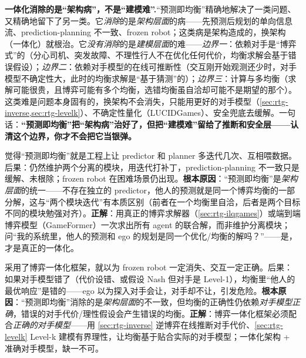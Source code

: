 \begin{insight}
\textbf{一体化消除的是“架构病”，不是“建模难”.}\;“预测即均衡”精确地解决了一类问题、又精确地留下了另一类。它\emph{消除}的是\emph{架构层面}的病——先预测后规划的单向信息流、prediction-planning 不一致、frozen robot；这类病是架构造成的，换架构（一体化）就根治。它\emph{没有消除}的是\emph{建模层面}的难——\emph{边界一}：依赖对手是“博弈式”的（分心司机、突发故障、不理性行人不在优化任何代价，均衡求解会基于错误假设）；\emph{边界二}：依赖对手模型的在线可推断性（交互刚开始观测还少时，对手模型不确定性大，此时的均衡求解是“基于猜测”的）；\emph{边界三}：计算与多均衡（求解可能很贵，且博弈可能有多个均衡，选错均衡虽自洽却可能不是期望的那个）。这类难是问题本身固有的，换架构不会消失，只能用更好的对手模型（\cref{sec:rtg-inverse,sec:rtg-levelk}）、不确定性量化（LUCIDGames）、安全兜底去缓解。一句话：\textbf{“预测即均衡”把“架构病”治好了，但把“建模难”留给了推断和安全层——认清这个边界，你才不会把它当银弹。}
\end{insight}

\begin{pitfall}
觉得“预测即均衡”就是工程上让 predictor 和 planner 多迭代几次、互相喂数据。后果：仍然维护两个分离的模块，用迭代打补丁，prediction-planning 不一致只是缓解、未根除；frozen robot 在困难场景仍出现。\textbf{根本原因}：“预测即均衡”是\emph{架构层面}的统一——不存在独立的 predictor，他人的预测就是同一个博弈均衡的一部分解，这与“两个模块迭代”有本质区别（前者在一个均衡里自洽，后者是两个目标不同的模块勉强对齐）。\textbf{正解}：用真正的博弈求解器（\cref{sec:rtg-ilqgames}）或端到端博弈模型（GameFormer）一次求出所有 agent 的联合解，而非维护分离模块；问“我的系统里，他人的预测和 ego 的规划是同一个优化/均衡的解吗？”——是，才是真正的一体化。
\end{pitfall}

\begin{pitfall}
采用了博弈一体化框架，就以为 frozen robot 一定消失、交互一定正确。后果：如果对手模型错了（代价设错、或假设 Nash 但对手是 Level-1），均衡里“他人的最优响应”是错的——ego 以为探入对手会让，对手却不让，引发危险。\textbf{根本原因}：“预测即均衡”消除的是\emph{架构层面}的不一致，但均衡的正确性仍依赖\emph{对手模型正确}，错误的对手代价/理性假设会产生错误的均衡。\textbf{正解}：博弈一体化框架必须配合\emph{正确的对手模型}——用 \cref{sec:rtg-inverse} 逆博弈在线推断对手代价、\cref{sec:rtg-levelk} Level-k 建模有界理性，让均衡基于贴合实际的对手模型；一体化架构 + 准确对手模型，缺一不可。
\end{pitfall}

